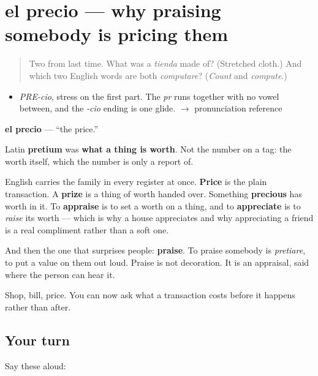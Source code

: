 \section[el precio]{el precio — why praising somebody is pricing them}

\label{lesson:ES-C311-precio}



\begin{quote}
Two from last time. What was a \emph{tienda} made of? (Stretched cloth.) And which two English words are both \emph{computare}? (\emph{Count} and \emph{compute}.)
\end{quote}

\begin{sounds}
\begin{itemize}
\raggedright
  \item \emph{PRE-cio}, stress on the first part. The \emph{pr} runs together with no vowel between, and the \emph{-cio} ending is one glide. $\to$ pronunciation reference
\end{itemize}
\end{sounds}

\begin{cousinweb}
\textbf{el precio} — \textquotedblleft{}the price.\textquotedblright{}

Latin \textbf{pretium} was \textbf{what a thing is worth}. Not the number on a tag: the worth itself, which the number is only a report of.

English carries the family in every register at once. \textbf{Price} is the plain transaction. A \textbf{prize} is a thing of worth handed over. Something \textbf{precious} has worth in it. To \textbf{appraise} is to set a worth on a thing, and to \textbf{appreciate} is to \emph{raise} its worth — which is why a house appreciates and why appreciating a friend is a real compliment rather than a soft one.

And then the one that surprises people: \textbf{praise}. To praise somebody is \emph{pretiare}, to put a value on them out loud. Praise is not decoration. It is an appraisal, said where the person can hear it.
\end{cousinweb}

\begin{grammarlens}[title={What you've built}]
Shop, bill, price. You can now ask what a transaction costs before it happens rather than after.
\end{grammarlens}

\subsection*{Your turn}
Say these aloud:

